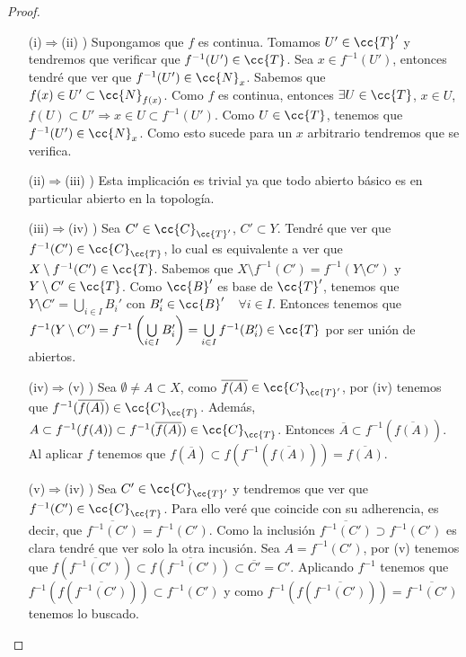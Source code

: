 \begin{prop}
    \begin{proof}\
        \begin{enumerate}
            \item[(i)$\Rightarrow$(ii) )] Supongamos que $f$ es continua. Tomamos $U' \in \cc{T}'$ y tendremos que verificar que $f^{-1}(U')\in \cc{T}$. Sea $x \in f^{-1}(U')$, entonces tendré que ver que $f^{-1}(U')\in \cc{N}_x$. Sabemos que $f(x)\in U' \subset \cc{N}_{f(x)}$. Como $f$ es continua, entonces $\exists U\in \cc{T} $, $x\in U$, $f(U)\subset U' \Rightarrow x \in U \subset f^{-1}(U')$. Como $U\in \cc{T}$, tenemos que $f^{-1}(U')\in \cc{N}_x$. Como esto sucede para un $x$ arbitrario tendremos que se verifica.
            \item[(ii)$\Rightarrow$(iii) )] Esta implicación es trivial ya que todo abierto básico es en particular abierto en la topología.
            \item[(iii)$\Rightarrow$(iv) )] Sea $C' \in \cc{C}_{\cc{T}'}$, $C'\subset Y$. Tendré que ver que $f^{-1}(C')\in \cc{C}_{\cc{T}}$, lo cual es equivalente a ver que $X \setminus f^{-1}(C')\in \cc{T}$. Sabemos que $X\setminus f^{-1}(C') = f^{-1}(Y\setminus C')$ y $Y\setminus C'\in \cc{T}$. Como $\cc{B}'$ es base de $\cc{T}'$, tenemos que $Y\setminus C'=\bigcup\limits_{i\in I} B_i'$ con $B_i'\in \cc{B}'$\ \ $\forall i \in I$. Entonces tenemos que $f^{-1}(Y\setminus C') = f^{-1}\left(\bigcup\limits_{i\in I}B_i'\right) = \bigcup\limits_{i\in I}f^{-1}(B_i')\in \cc{T}$ por ser unión de abiertos.
            \item[(iv)$\Rightarrow$(v) )] Sea $\emptyset \neq A \subset X$, como $\overline{f(A)}\in \cc{C}_{\cc{T}'}$, por (iv) tenemos que $f^{-1}(\overline{f(A)})\in \cc{C}_{\cc{T}}$. Además, $A \subset f^{-1}(f(A))\subset f^{-1}(\overline{f(A)})\in \cc{C}_{\cc{T}}$. Entonces $\overline{A}\subset f^{-1}(\overline{f(A)})$. Al aplicar $f$ tenemos que $f(\overline{A})\subset f(f^{-1}(\overline{f(A)}))=\overline{f(A)}$.
            \item[(v)$\Rightarrow$(iv) )] Sea $C' \in \cc{C}_{\cc{T}'}$ y tendremos que ver que $f^{-1}(C')\in \cc{C}_{\cc{T}}$. Para ello veré que coincide con su adherencia, es decir, que $\overline{f^{-1}(C')} = f^{-1}(C')$. Como la inclusión $\overline{f^{-1}(C')} \supset f^{-1}(C')$ es clara tendré que ver solo la otra incusión. Sea $A=f^{-1}(C')$, por (v) tenemos que $f(\overline{f^{-1}(C')})\subset \overline{f(f^{-1}(C'))} \subset \overline{C'}=C'$. Aplicando $f^{-1}$ tenemos que $f^{-1}(f(\overline{f^{-1}(C')}))\subset f^{-1}(C')$ y como $f^{-1}(f(\overline{f^{-1}(C')})) = \overline{f^{-1}(C')}$ tenemos lo buscado.

\end{enumerate}
\end{proof}
\end{prop}

